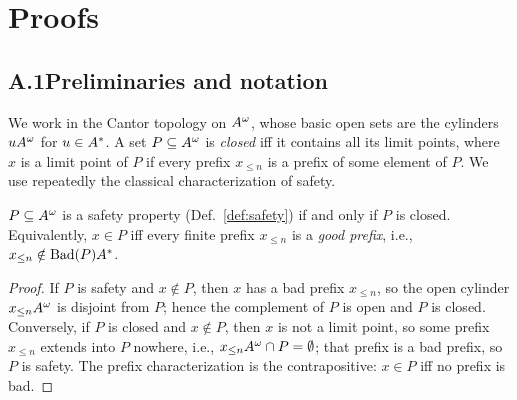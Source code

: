 \section{Proofs}


\subsection*{A.1\quad Preliminaries and notation}
We work in the Cantor topology on $A^{\omega}$, whose basic open sets are the
cylinders $uA^{\omega}$ for $u\in A^{*}$. A set $P\subseteq A^{\omega}$ is \emph{closed}
iff it contains all its limit points, where $x$ is a limit point of $P$ if every
prefix $x_{\le n}$ is a prefix of some element of $P$. We use repeatedly the
classical characterization of safety.

\begin{lemma}\label{lem:safety-closed}
$P\subseteq A^{\omega}$ is a safety property (Def.~\ref{def:safety}) if and only if
$P$ is closed. Equivalently, $x\in P$ iff every finite prefix $x_{\le n}$ is a
\emph{good prefix}, i.e., $x_{\le n}\notin\mathrm{Bad}(P)A^{*}$.
\end{lemma}
\begin{proof}
If $P$ is safety and $x\notin P$, then $x$ has a bad prefix $x_{\le n}$, so the
open cylinder $x_{\le n}A^{\omega}$ is disjoint from $P$; hence the complement of $P$
is open and $P$ is closed. Conversely, if $P$ is closed and $x\notin P$, then $x$
is not a limit point, so some prefix $x_{\le n}$ extends into $P$ nowhere, i.e.,
$x_{\le n}A^{\omega}\cap P=\emptyset$; that prefix is a bad prefix, so $P$ is safety.
The prefix characterization is the contrapositive: $x\in P$ iff no prefix is bad.
\end{proof}

